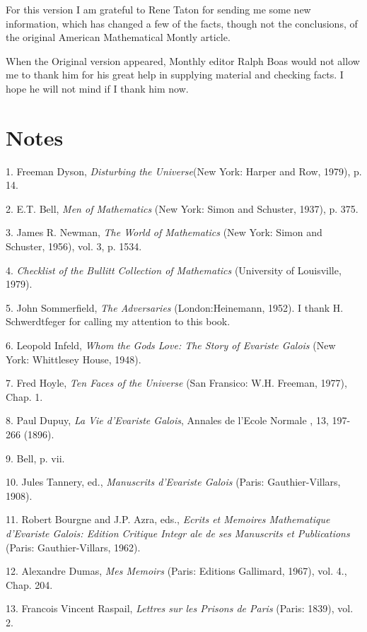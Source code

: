 \documentclass[12pt]{article}
\begin{document}
For this version I am grateful to Rene Taton for sending me some new information, which has changed a few of the facts, though not the conclusions, of the original American Mathematical Montly article.

When the Original version appeared, Monthly editor Ralph Boas would not allow me to thank him for his great help in supplying material and checking facts. I hope he will not mind if I thank him now. 

\section*{Notes}
\parskip=12pt
\parindent=0pt

\frenchspacing
\small

1. Freeman Dyson, \emph{Disturbing the Universe}(New York: Harper and Row, 1979), p. 14. 

2. E.T. Bell, {\it Men of Mathematics} (New York: Simon and Schuster, 1937), p. 375. 

3. James R. Newman, {\it The World of Mathematics} (New York: Simon and Schuster, 1956), vol. 3, p. 1534. 

4. \emph{Checklist of the Bullitt Collection of Mathematics} (University of Louisville, 1979). 

5. John Sommerfield, \emph{The Adversaries} (London:Heinemann, 1952). I thank H. Schwerdtfeger for calling my attention to
this book. 

6. Leopold Infeld, \emph{Whom the Gods Love: The Story of Evariste Galois} (New York: Whittlesey House, 1948). 

7. Fred Hoyle, \emph{Ten Faces of the Universe} (San Fransico: W.H. Freeman, 1977), Chap. 1. 

8. Paul Dupuy, \emph{La Vie d'Evariste Galois}, Annales de l'Ecole Normale , 13, 197-266 (1896). 

9. Bell, p. vii. 

10. Jules Tannery, ed., \emph{Manuscrits d'Evariste Galois} (Paris: Gauthier-Villars, 1908). 

11. Robert Bourgne and J.P. Azra, eds., \emph{Ecrits et Memoires Mathematique d'Evariste Galois: Edition Critique Integr
ale de ses Manuscrits et Publications} (Paris: Gauthier-Villars, 1962). 

12. Alexandre Dumas, \emph{Mes Memoirs} (Paris: Editions Gallimard, 1967), vol. 4., Chap. 204. 

13. Francois Vincent Raspail, \emph{Lettres sur les Prisons de Paris} (Paris: 1839), vol. 2. 
\end{document}
